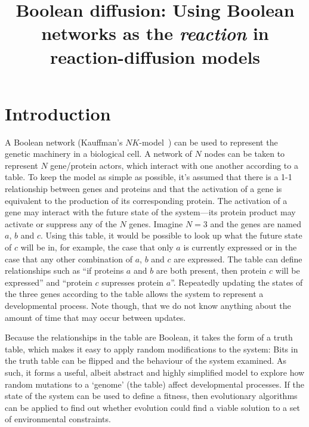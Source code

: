 \documentclass[11pt, a4paper]{article}
\title {
  Boolean diffusion: Using Boolean networks as the \emph{reaction} in reaction-diffusion models
}
\date{} %
\author{\Authors}
\begin{document}
\setlength{\droptitle}{-1.8cm} %
\maketitle

\vspace{-1.8cm} %

\section{Introduction}

A Boolean network (Kauffman's $NK$-model~\cite{kauffman_origins_1993}) can be
used to represent the genetic machinery in a biological cell. A network of $N$
nodes can be taken to represent $N$ gene/protein actors, which interact with
one another according to a table. To keep the model as simple as possible,
it's assumed that there is a 1-1 relationship between genes and proteins and
that the activation of a gene is equivalent to the production of its
corresponding protein. The activation of a gene may interact with the future
state of the system---its protein product may activate or suppress any of the
$N$ genes. Imagine $N=3$ and the genes are named $a$, $b$ and $c$. Using this
table, it would be possible to look up what the future state of $c$ will be
in, for example, the case that only $a$ is currently expressed or in the case
that any other combination of $a$, $b$ and $c$ are expressed. The table can
define relationships such as ``if proteins $a$ and $b$ are both present, then
protein $c$ will be expressed'' and ``protein $c$ supresses protein
$a$''. Repeatedly updating the states of the three genes according to the
table allows the system to represent a developmental process. Note though,
that we do not know anything about the amount of time that may occur between
updates.

Because the relationships in the table are Boolean, it takes the form of a
truth table, which makes it easy to apply random modifications to the system:
Bits in the truth table can be flipped and the behaviour of the system
examined. As such, it forms a useful, albeit abstract and highly simplified
model to explore how random mutations to a `genome' (the table) affect
developmental processes. If the state of the system can be used to define a
fitness, then evolutionary algorithms can be applied to find out whether
evolution could find a viable solution to a set of environmental constraints.
\end{document}
